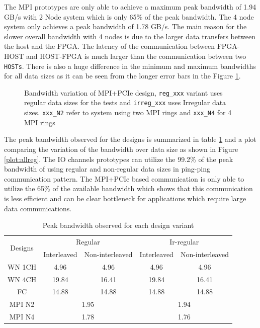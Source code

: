The MPI prototypes are only able to achieve a maximum peak bandwidth of 1.94 GB/s with 2 Node system
which is only 65\% of the peak bandwidth. The 4 node system only achieves a peak bandwidth of
1.78 GB/s. The main reason for the slower overall bandwidth with 4 nodes is due to the larger
data transfers between the host and the FPGA. The latency of the communication between FPGA-HOST
and HOST-FPGA is much larger than the communication between two \texttt{HOSTs}. There is also a huge difference
in the minimum and maximum bandwidths for all data sizes as it can be seen from the longer error bars in the
Figure \ref{plot:mpipcie}.
\begin{figure}[ht]
    \centering
    \scalebox{0.7}{}
    \caption{Bandwidth variation of MPI+PCIe design,
    \texttt{reg\_xxx} variant uses regular data sizes for the tests and \texttt{irreg\_xxx} uses Irregular data sizes.
    \texttt{xxx\_N2} refer to system using two MPI rings and \texttt{xxx\_N4} for 4 MPI rings}
    \label{plot:mpipcie}
\end{figure}

The peak bandwidth observed for the designs is summarized in table \ref{tab:obs_peakbw} and a plot comparing the variation
of the bandwidth over data size as shown in Figure \ref{plot:allreg}. The IO channels prototypes can
utilize the 99.2\% of the peak bandwidth of using regular and non-regular data sizes in ping-ping
communication pattern. The MPI+PCIe based communication is only able to utilize the 65\% of the available
bandwidth which shows that this communication is less efficient and can be clear bottleneck for applications
which require large data communications.
\begin{table}[ht]
    \centering
    \begin{tabular}{ccccc}
    \multicolumn{1}{c}{\multirow{2}{*}{Designs}} & \multicolumn{2}{c}{Regular} & \multicolumn{2}{c}{Ir-regular} \\ \cline{2-5}
    \multicolumn{1}{c}{} & Interleaved & \multicolumn{1}{c}{Non-interleaved} & Interleaved & \multicolumn{1}{c}{Non-interleaved} \\ \hline
    WN 1CH & \multicolumn{1}{c}{4.96} & 4.96 & \multicolumn{1}{c}{4.96} & 4.96 \\ \hline
    WN 4CH & \multicolumn{1}{c}{19.84} & 16.41 & \multicolumn{1}{c}{19.84} & 16.41 \\ \hline
    FC & \multicolumn{1}{c}{14.88} & 14.88 & \multicolumn{1}{c}{14.88} & 14.88 \\ \hline
    MPI N2 & \multicolumn{2}{c}{1.95} & \multicolumn{2}{c}{1.94} \\ \hline
    MPI N4 & \multicolumn{2}{c}{1.78} & \multicolumn{2}{c}{1.76} \\ \hline
    \end{tabular}%
    \caption{Peak bandwidth observed for each design variant}
    \label{tab:obs_peakbw}
\end{table}

